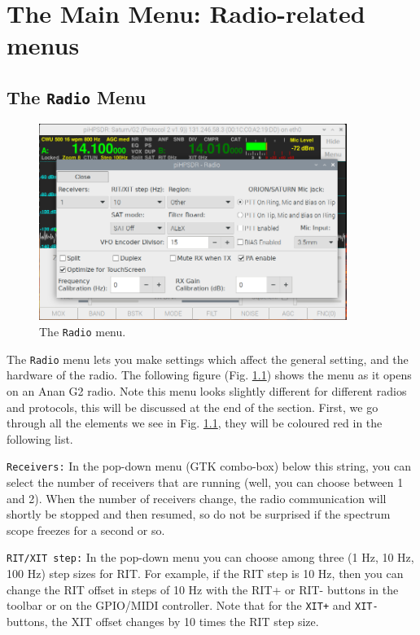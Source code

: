 \documentclass[12pt]{book}
\def\rett#1{\texttt{\color{red}#1}}
\def\bltt#1{\texttt{\color{blue}#1}}
\begin{document}
\chapter[Radio-related menus]{The Main Menu: Radio-related menus}
\section{The \texttt{Radio} Menu}

\begin{figure}[ht]
\center
\includegraphics[width=10cm]{RadioMenu.png}
\caption{The \bltt{Radio} menu.}
\label{fig:RadioMenu}
\end{figure}


The \bltt{Radio} menu lets you make settings which affect the general setting, and the hardware of the
radio.
The following figure (Fig. \ref{fig:RadioMenu}) shows the menu as it opens on an Anan G2 radio.
Note this menu looks slightly different for different radios and protocols, this will be discussed
at the end of the section. First, we go through all the elements we see in Fig. \ref{fig:RadioMenu},
they will be coloured red in the following list.

\rett{Receivers:} In the pop-down menu (GTK combo-box) below this string, you can select the number
of receivers that are running (well, you can choose between 1 and 2). When the number of receivers change,
the radio communication will shortly be stopped and then resumed, so do not be surprised if the spectrum
scope freezes for a second or so.

\rett{RIT/XIT step:} In the pop-down menu you can choose among three (1 Hz, 10 Hz, 100 Hz) step sizes
for RIT. For example, if the RIT step is 10 Hz, then you can change the RIT offset in steps of
10 Hz with the RIT+ or RIT- buttons in the toolbar or on the GPIO/MIDI controller. Note that for the
\bltt{XIT+} and \bltt{XIT-} buttons, the XIT offset changes by 10 times the RIT step size.
\end{document}
